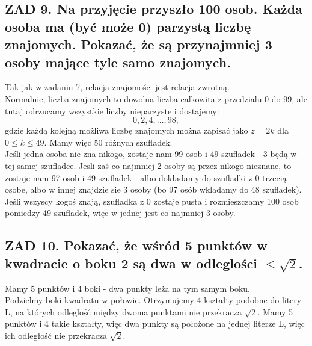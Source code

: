 \documentclass{article}
\begin{document}
\subsection*{ZAD 9. Na przyjęcie przyszło 100 osob. Każda osoba ma (być może 0) parzystą liczbę znajomych. Pokazać, że są przynajmniej 3 osoby mające tyle samo znajomych.}
  Tak jak w zadaniu 7, relacja znajomości jest relacja zwrotną.\\
  Normalnie, liczba znajomych to dowolna liczba calkowita z przedzialu 0 do 99, ale tutaj odrzucamy wszystkie liczby nieparzyste i dostajemy:
  $$0, 2, 4, ..., 98,$$
  gdzie każdą kolejną możliwa liczbę znajomych można zapisać jako $z = 2k$ dla $0\leq k\leq49$. Mamy więc 50 różnych szufladek. \\
  Jeśli jedna osoba nie zna nikogo, zostaje nam 99 osob i 49 szufladek - 3 będą w tej samej szufladce. Jesli zaś co najmniej 2 osoby są przez nikogo nieznane, to zostaje nam 97 osob i 49 szufladek - albo dokładamy do szufladki z 0 trzecią osobe, albo w innej znajdzie sie 3 osoby (bo 97 osób wkladamy do 48 szufladek).\\
  Jeśli wszyscy kogoś znają, szufladka z 0 zostaje pusta i rozmieszczamy 100 osob pomiedzy 49 szufladek, więc w jednej jest co najmniej 3 osoby.
\newpage
\subsection*{ZAD 10. Pokazać, że wśród 5 punktów w kwadracie o boku 2 są dwa w odleglości $\leq\sqrt{2}$.}
  Mamy 5 punktów i 4 boki - dwa punkty leża na tym samym boku.\smallskip\\
  Podzielmy boki kwadratu w połowie. Otrzymujemy 4 kształty podobne do litery L, na których odleglość między dwoma punktami nie przekracza $\sqrt{2}$. Mamy 5 punktów i 4 takie kształty, więc dwa punkty są położone na jednej literze L, więc ich odległość nie przekracza $\sqrt{2}$.
\newpage
\end{document}
